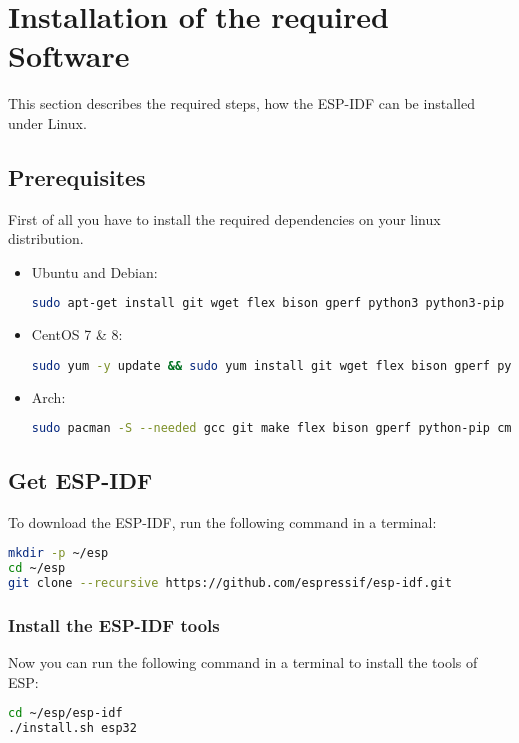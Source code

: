 \section{Installation of the required Software}
This section describes the required steps, how the ESP-IDF can be installed under Linux.


\subsection{Prerequisites}

First of all you have to install the required dependencies on your linux distribution.

\begin{itemize}

\item Ubuntu and Debian:
\begin{lstlisting}[language=bash]
sudo apt-get install git wget flex bison gperf python3 python3-pip python3-setuptools cmake ninja-build ccache libffi-dev libssl-dev dfu-util libusb-1.0-0
\end{lstlisting}

\item CentOS 7 \& 8:
\begin{lstlisting}[language=bash]
sudo yum -y update && sudo yum install git wget flex bison gperf python3 python3-pip python3-setuptools cmake ninja-build ccache dfu-util libusbx
\end{lstlisting}

\item Arch:
\begin{lstlisting}[language=bash]
sudo pacman -S --needed gcc git make flex bison gperf python-pip cmake ninja ccache dfu-util libusb
\end{lstlisting}

\end{itemize}

\subsection{Get ESP-IDF}
To download the ESP-IDF, run the following command in a terminal:
\begin{lstlisting}[language=bash]
mkdir -p ~/esp
cd ~/esp
git clone --recursive https://github.com/espressif/esp-idf.git
\end{lstlisting}\cite{EspressifGetStartedGetESPIDF}

\subsubsection{Install the ESP-IDF tools}
Now you can run the following command in a terminal to install the tools of ESP:
\begin{lstlisting}[language=bash]
cd ~/esp/esp-idf
./install.sh esp32
\end{lstlisting}\cite{EspressifGetStartedsetUpTheTools}

